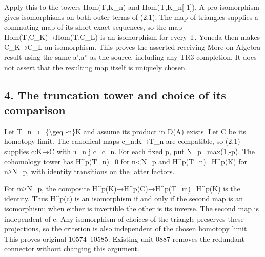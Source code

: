 \documentclass[11pt]{article}
\begin{document}
Apply this to the towers Hom(T,\allowbreak{}K\_\allowbreak{}n)\allowbreak{} and Hom(T,\allowbreak{}K\_\allowbreak{}n[-1]\allowbreak{})\allowbreak{}. A pro-isomorphism gives isomorphisms on both outer terms of (2.1)\allowbreak{}. The map of triangles supplies a commuting map of its short exact sequences,\allowbreak{} so the map Hom(T,\allowbreak{}C\_\allowbreak{}K)\allowbreak{}\allowbreak{}→Hom(T,\allowbreak{}C\_\allowbreak{}L)\allowbreak{} is an isomorphism for every T. Yoneda then makes C\_\allowbreak{}K\allowbreak{}→C\_\allowbreak{}L an isomorphism. This proves the asserted receiving More on Algebra result using the same a',\allowbreak{}a'' as the source,\allowbreak{} including any TR3 completion. It does not assert that the resulting map itself is uniquely chosen.

\subsection{4. The truncation tower and choice of its comparison}\label{proofs-10435-10686-the-truncation-tower-and-choice-of-its-comparison}

Let T\_\allowbreak{}n\allowbreak{}=τ\_\allowbreak{}\{\textbackslash{}geq -n\}K and assume its product in D(A)\allowbreak{} exists. Let C be its homotopy limit. The canonical maps c\_\allowbreak{}n:\allowbreak{}K\allowbreak{}→T\_\allowbreak{}n are compatible,\allowbreak{} so (2.1)\allowbreak{} supplies c:\allowbreak{}K\allowbreak{}→C with π\_\allowbreak{}n j c\allowbreak{}=c\_\allowbreak{}n. For each fixed p,\allowbreak{} put N\_\allowbreak{}p\allowbreak{}=max(1,\allowbreak{}-p)\allowbreak{}. The cohomology tower has H\textasciicircum{}p(T\_\allowbreak{}n)\allowbreak{}\allowbreak{}=0 for n<N\_\allowbreak{}p and H\textasciicircum{}p(T\_\allowbreak{}n)\allowbreak{}\allowbreak{}=H\textasciicircum{}p(K)\allowbreak{} for n≥N\_\allowbreak{}p,\allowbreak{} with identity transitions on the latter factors.

For m≥N\_\allowbreak{}p,\allowbreak{} the composite H\textasciicircum{}p(K)\allowbreak{}\allowbreak{}→H\textasciicircum{}p(C)\allowbreak{}\allowbreak{}→H\textasciicircum{}p(T\_\allowbreak{}m)\allowbreak{}\allowbreak{}=H\textasciicircum{}p(K)\allowbreak{} is the identity. Thus H\textasciicircum{}p(c)\allowbreak{} is an isomorphism if and only if the second map is an isomorphism:\allowbreak{} when either is invertible the other is its inverse. The second map is independent of c. Any isomorphism of choices of the triangle preserves these projections,\allowbreak{} so the criterion is also independent of the chosen homotopy limit. This proves original 10574–\allowbreak{}10585. Existing unit 0887 removes the redundant connector without changing this argument.
\end{document}
